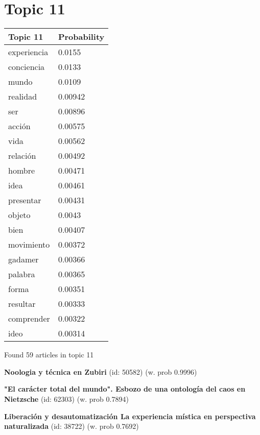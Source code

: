 \documentclass{article}
\begin{document}
\vfill
\newpage


\centering
\thispagestyle{empty}
\section*{Topic 11}\vfill
\begin{tabular}{ll}
\toprule
    Topic 11 & Probability \\
\midrule
 experiencia &      0.0155 \\
  conciencia &      0.0133 \\
       mundo &      0.0109 \\
    realidad &     0.00942 \\
         ser &     0.00896 \\
      acción &     0.00575 \\
        vida &     0.00562 \\
    relación &     0.00492 \\
      hombre &     0.00471 \\
        idea &     0.00461 \\
   presentar &     0.00431 \\
      objeto &      0.0043 \\
        bien &     0.00407 \\
  movimiento &     0.00372 \\
     gadamer &     0.00366 \\
     palabra &     0.00365 \\
       forma &     0.00351 \\
    resultar &     0.00333 \\
  comprender &     0.00322 \\
        ideo &     0.00314 \\
\bottomrule
\end{tabular}

\vfill
Found 59 articles in topic 11
\vfill

\textbf{Noologia y técnica en Zubiri} (id: 50582)
 (w. prob 0.9996)
\vfill

\textbf{"El carácter total del mundo". Esbozo de una ontología del caos en Nietzsche} (id: 62303)
 (w. prob 0.7894)
\vfill

\textbf{Liberación y desautomatización La experiencia mística en perspectiva naturalizada} (id: 38722)
 (w. prob 0.7692)

\vfill
\newpage


\centering
\thispagestyle{empty}
\end{document}
